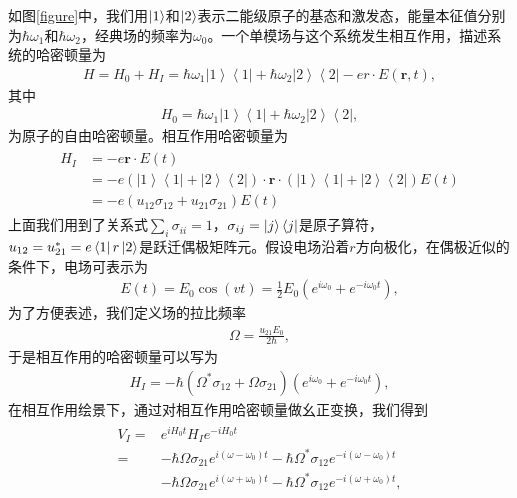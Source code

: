 如图\ref{figure}中，我们用$\ket{1}$和$\ket{2}$表示二能级原子的基态和激发态，能量本征值分别为$\hbar \omega_1$和$\hbar \omega_2$，经典场的频率为$\omega_0$。一个单模场与这个系统发生相互作用，描述系统的哈密顿量为
\begin{align}
H = {H_0} + {H_I} = \hbar {\omega _1}\left| 1 \right\rangle \left\langle 1 \right| + \hbar {\omega _2}\left| 2 \right\rangle \left\langle 2 \right| - er \cdot E(\bm
{r},t),\label{eq43}
\end{align}
其中
\begin{align}
{H_0} = \hbar {\omega _1}\left| 1 \right\rangle \left\langle 1 \right| + \hbar {\omega _2}\left| 2 \right\rangle \left\langle 2 \right|,\label{eq44}
\end{align}
为原子的自由哈密顿量。相互作用哈密顿量为
\begin{align}\label{eq45}
\begin{split}
{H_I} &=  - e\bm{r} \cdot E(t)\\
      &= - e\left( {\left| 1 \right\rangle \left\langle 1 \right| + \left| 2 \right\rangle \left\langle 2 \right|} \right) \cdot \bm{r} \cdot \left( {\left| 1 \right\rangle \left\langle 1 \right| + \left| 2 \right\rangle \left\langle 2 \right|} \right)E\left( t \right)\\
      &=  - e\left( {{u_{12}}{\sigma _{12}} + {u_{21}}{\sigma _{21}}} \right)E\left( t \right)
\end{split}
\end{align}
上面我们用到了关系式$\sum_i\sigma_{ii}=1$，$\sigma_{ij}=\ket{j}\bra{j}$是原子算符，$u_{12}=u_{21}^*=e\bra{1}r\ket{2}$是跃迁偶极矩阵元。假设电场沿着$r$方向极化，在偶极近似的条件下，电场可表示为
\begin{align}
E(t) = {E_0}\cos (vt) = \frac{1}{2}{E_0}({e^{i{\omega _0}}} + {e^{ - i{\omega _0}t}}),\label{eq46}
\end{align}
为了方便表述，我们定义场的拉比频率
\begin{align}
\Omega  = \frac{{{u_{21}}{E_0}}}{{2\hbar }},\label{eq47}
\end{align}
于是相互作用的哈密顿量可以写为
\begin{align}
{H_I} =  - \hbar \left( {{\Omega ^*}{\sigma _{12}} + \Omega {\sigma _{21}}} \right)({e^{i{\omega _0}}} + {e^{ - i{\omega _0}t}}),\label{eq48}
\end{align}
在相互作用绘景下，通过对相互作用哈密顿量做幺正变换，我们得到
\begin{align}\label{eq49}
\begin{split}
{V_I} =& {e^{i{H_0}t}}{H_I}{e^{ - i{H_0}t}}\\
      =&  - \hbar \Omega {\sigma _{21}}{e^{i\left( {\omega  - {\omega _0}} \right)t}} - \hbar {\Omega ^*}{\sigma _{12}}{e^{ - i\left( {\omega  - {\omega _0}} \right)t}}\\
&- \hbar \Omega {\sigma _{21}}{e^{i\left( {\omega  + {\omega _0}} \right)t}} - \hbar {\Omega ^*}{\sigma _{12}}{e^{ - i\left( {\omega  + {\omega _0}} \right)t}},
\end{split}
\end{align}
